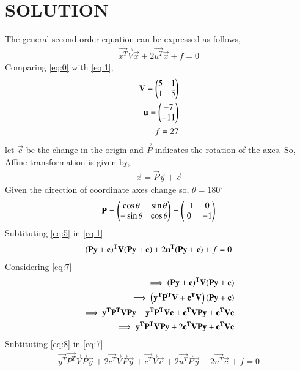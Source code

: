 \documentclass[journal,12pt,twocolumn]{IEEEtran}
\begin{document}
\section{SOLUTION}
The general second order equation can be expressed as follows,
\begin{align}
\vec{x^T}\vec{V}\vec{x}+2\vec{u^T}\vec{x}+f=0\label{eq:1}
\end{align}
Comparing \eqref{eq:0} with \eqref{eq:1},
\begin{align}
\mathbf{V} = \begin{pmatrix}5 & 1\\1 & 5\end{pmatrix}\label{eq:2}\\
\mathbf{u} = \begin{pmatrix}-7\\ -11\end{pmatrix}\label{eq:3}\\
f = 27\label{eq:4}
\end{align}
let $\vec{c}$ be the change in the origin and $\vec{P}$ indicates the rotation of the axes. So, Affine transformation is given by,
\begin{align}
    \vec{x} = \vec{P}\vec{y}+\vec{c} \label{eq:5}
\end{align}
Given the direction of coordinate axes change so, $\theta = 180^{{\circ}}$
\begin{align}
    \mathbf{P}=\begin{pmatrix}\cos\theta & \sin\theta\\ -\sin\theta& \cos\theta\end{pmatrix} = \begin{pmatrix}-1&0\\0&-1\end{pmatrix}\label{eq:6}
\end{align}
Subtituting \eqref{eq:5} in \eqref{eq:1}
\begin{align}
\mathbf{\left(\mathbf{P}\mathbf{y}+\mathbf{c}\right)^T}\mathbf{V}\mathbf{\left(\mathbf{P}\mathbf{y}+\mathbf{c}\right)}+2\mathbf{u^T}\mathbf{\left(\mathbf{P}\mathbf{y}+\mathbf{c}\right)}+f=0\label{eq:7}
\end{align}
Considering \eqref{eq:7}
\begin{align}
\implies \mathbf{\left(\mathbf{P}\mathbf{y}+\mathbf{c}\right)^T}\mathbf{V}\mathbf{\left(\mathbf{P}\mathbf{y}+\mathbf{c}\right)}\\
\implies \left(\mathbf{y^T}\mathbf{P^T}\mathbf{V}+\mathbf{c^T}\mathbf{V}\right)\left(\mathbf{P}\mathbf{y}+\mathbf{c}\right)\\
\implies \mathbf{y^T}\mathbf{P^T}\mathbf{V}\mathbf{P}\mathbf{y}+ \mathbf{y^T}\mathbf{P^T}\mathbf{V}\mathbf{c}+ \mathbf{c^T}\mathbf{V}\mathbf{P}\mathbf{y} + \mathbf{c^T}\mathbf{V}\mathbf{c}\\
\implies \mathbf{y^T}\mathbf{P^T}\mathbf{V}\mathbf{P}\mathbf{y}+ 2\mathbf{c^T}\mathbf{V}\mathbf{P}\mathbf{y} + \mathbf{c^T}\mathbf{V}\mathbf{c}\label{eq:8}
\end{align}
Subtituting \eqref{eq:8} in \eqref{eq:7}
\begin{align}
\vec{y^T}\vec{P^T}\vec{V}\vec{P}\vec{y}+ 2\vec{c^T}\vec{V}\vec{P}\vec{y} + \vec{c^T}\vec{V}\vec{c} +2\vec{u^T}\vec{P}\vec{y}+2\vec{u^T}\vec{c} + f =  0 \label{eq:9}
\end{align}
\end{document}

